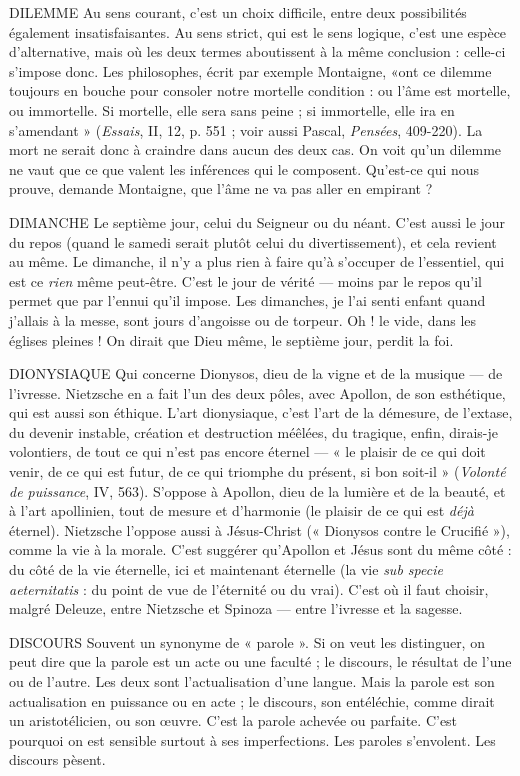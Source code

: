 DILEMME Au sens courant, c’est un choix difficile, entre deux possibilités
également insatisfaisantes. Au sens strict, qui est le sens logique,
c’est une espèce d’alternative, mais où les deux termes aboutissent à la même
conclusion : celle-ci s'impose donc. Les philosophes, écrit par exemple Montaigne,
«ont ce dilemme toujours en bouche pour consoler notre mortelle condition : ou
l’âme est mortelle, ou immortelle. Si mortelle, elle sera sans peine ; si immortelle,
elle ira en s’amendant » ({\it Essais}, II, 12, p. 551 ; voir aussi Pascal, {\it Pensées}, 409-220).
La mort ne serait donc à craindre dans aucun des deux cas. On voit qu'un
dilemme ne vaut que ce que valent les inférences qui le composent. Qu'est-ce qui
nous prouve, demande Montaigne, que l’âme ne va pas aller en empirant ?

DIMANCHE Le septième jour, celui du Seigneur ou du néant. C’est aussi
le jour du repos (quand le samedi serait plutôt celui du divertissement),
et cela revient au même. Le dimanche, il n’y a plus rien à faire qu’à
s'occuper de l'essentiel, qui est ce {\it rien} même peut-être. C’est le jour de vérité
— moins par le repos qu’il permet que par l'ennui qu’il impose. Les dimanches,
je l’ai senti enfant quand j'allais à la messe, sont jours d’angoisse ou de torpeur.
Oh ! le vide, dans les églises pleines ! On dirait que Dieu même, le septième
jour, perdit la foi.

DIONYSIAQUE Qui concerne Dionysos, dieu de la vigne et de la musique
— de l'ivresse. Nietzsche en a fait l’un des deux pôles, avec
Apollon, de son esthétique, qui est aussi son éthique. L’art dionysiaque, c’est
l’art de la démesure, de l’extase, du devenir instable, création et destruction
méêlées, du tragique, enfin, dirais-je volontiers, de tout ce qui n’est pas encore
éternel — « le plaisir de ce qui doit venir, de ce qui est futur, de ce qui triomphe
du présent, si bon soit-il » ({\it Volonté de puissance}, IV, 563). S’oppose à Apollon,
dieu de la lumière et de la beauté, et à l’art apollinien, tout de mesure et d’harmonie
(le plaisir de ce qui est {\it déjà} éternel). Nietzsche l’oppose aussi à Jésus-Christ
(« Dionysos contre le Crucifié »), comme la vie à la morale. C’est suggérer
qu’Apollon et Jésus sont du même côté : du côté de la vie éternelle, ici et
maintenant éternelle (la vie {\it sub specie aeternitatis} : du point de vue de l’éternité
ou du vrai). C’est où il faut choisir, malgré Deleuze, entre Nietzsche et Spinoza
— entre l’ivresse et la sagesse.

DISCOURS Souvent un synonyme de « parole ». Si on veut les distinguer,
on peut dire que la parole est un acte ou une faculté ; le discours,
le résultat de l’une ou de l’autre. Les deux sont l’actualisation d’une
langue. Mais la parole est son actualisation en puissance ou en acte ; le discours,
son entéléchie, comme dirait un aristotélicien, ou son œuvre. C’est la parole
achevée ou parfaite. C’est pourquoi on est sensible surtout à ses imperfections.
Les paroles s’envolent. Les discours pèsent.

